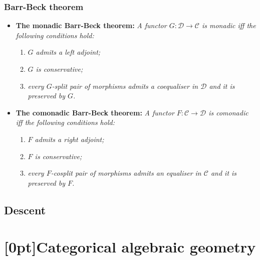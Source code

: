 \documentclass[10pt]{article}
\newcommand{\ccat}{\mathcal{C}}
\newcommand{\dcat}{\mathcal{D}}
\newcommand{\CT}{\textcolor{orange}{CT}}
\begin{document}
            \subsubsection{Barr-Beck theorem}

                \begin{itemize}
                    \item \textbf{The monadic Barr-Beck theorem:}
                        \emph{A functor $G\colon\dcat\to\ccat$ is monadic iff the following conditions hold:}
                        \begin{enumerate}
                            \item \emph{$G$ admits a left adjoint;}
                            \item \emph{$G$ is conservative;}
                            \item \emph{every $G$-split pair of morphisms admits a coequaliser in $\dcat$ and it is preserved by $G$.}
                        \end{enumerate}

                    \item \textbf{The comonadic Barr-Beck theorem:}
                        \emph{A functor $F\colon\ccat\to\dcat$ is comonadic iff the following conditions hold:}
                        \begin{enumerate}
                            \item \emph{$F$ admits a right adjoint;}
                            \item \emph{$F$ is conservative;}
                            \item \emph{every $F$-cosplit pair of morphisms admits an equaliser in $\ccat$ and it is preserved by $F$.}
                        \end{enumerate}
                \end{itemize}

        \subsection{Descent}

    
    \section{\protect\marginnote{\CT}[0pt]Categorical algebraic geometry}
\end{document}
